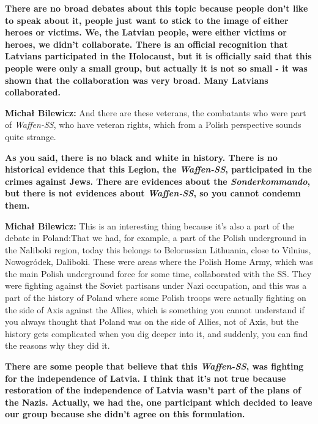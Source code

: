 \textbf{There are no broad debates about this topic because people don't like to speak about it, people just want to stick to the image of either heroes or victims. We, the Latvian people, were either victims or heroes,  we didn’t collaborate. There is an official recognition that Latvians participated in the Holocaust, but it is officially said that this people were only a small group, but actually it is not so small - it was shown that the collaboration was very broad. Many Latvians collaborated.} 

\textbf{Michał Bilewicz:} And there are these veterans, the combatants who were part of \textit{Waffen-SS}, who have veteran rights, which from a Polish perspective sounds quite strange. 

\textbf{As you said, there is no black and white in history. There is no historical evidence that this Legion, the \textit{Waffen-SS}, participated in the crimes against Jews. There are evidences about the \textit{Sonderkommando}, but there is not evidences about \textit{Waffen-SS}, so you cannot condemn them.}

\textbf{Michał Bilewicz:} This is an interesting thing because it's also a part of the debate in Poland:That we had, for example, a part of the Polish underground in the Naliboki region, today this belongs to Belorussian Lithuania, close to Vilnius, Nowogródek, Daliboki. These were areas where the Polish Home Army, which was the main Polish underground force for some time, collaborated with the SS. They were fighting against the Soviet partisans  under Nazi occupation, and this was a part of the history of Poland where some Polish troops were actually fighting on the side of Axis against the Allies, which is something you cannot understand if you always thought that Poland was on the side of Allies, not of Axis, but the history gets complicated when you dig deeper into it, and suddenly, you can find the reasons why they did it. 

\textbf{There are some people that believe that this \textit{Waffen-SS}, was fighting for the independence of Latvia. I think that it’s not true because restoration of the independence of Latvia wasn't part of the plans of the Nazis. Actually, we had the, one participant which decided to leave our group because she didn't agree on this formulation.} 

